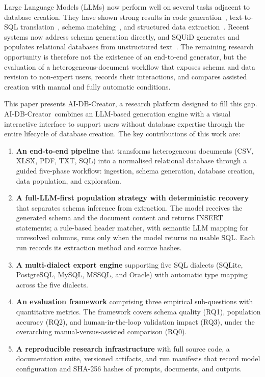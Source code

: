 \documentclass[11pt,a4paper]{article}
\newcommand{\aidb}{AI-DB-Creator}
\begin{document}
Large Language Models (LLMs) now perform well on several tasks adjacent to database creation. They have shown strong results in code generation~\citep{chen2021evaluating}, text-to-SQL translation~\citep{yu2018spider}, schema matching~\citep{parciak2024schema}, and structured data extraction~\citep{narayan2022data}. Recent systems now address schema generation directly, and SQUiD generates and populates relational databases from unstructured text~\citep{wang2025schemaagent,sadia2025squid}. The remaining research opportunity is therefore not the existence of an end-to-end generator, but the evaluation of a heterogeneous-document workflow that exposes schema and data revision to non-expert users, records their interactions, and compares assisted creation with manual and fully automatic conditions.

This paper presents \aidb, a research platform designed to fill this gap. \aidb\ combines an LLM-based generation engine with a visual interactive interface to support users without database expertise through the entire lifecycle of database creation. The key contributions of this work are:

\begin{enumerate}
  \item \textbf{An end-to-end pipeline} that transforms heterogeneous documents (CSV, XLSX, PDF, TXT, SQL) into a normalised relational database through a guided five-phase workflow: ingestion, schema generation, database creation, data population, and exploration.
  \item \textbf{A full-LLM-first population strategy with deterministic recovery} that separates schema inference from extraction. The model receives the generated schema and the document content and returns INSERT statements; a rule-based header matcher, with semantic LLM mapping for unresolved columns, runs only when the model returns no usable SQL. Each run records its extraction method and source hashes.
  \item \textbf{A multi-dialect export engine} supporting five SQL dialects (SQLite, PostgreSQL, MySQL, MSSQL, and Oracle) with automatic type mapping across the five dialects.
  \item \textbf{An evaluation framework} comprising three empirical sub-questions with quantitative metrics. The framework covers schema quality (RQ1), population accuracy (RQ2), and human-in-the-loop validation impact (RQ3), under the overarching manual-versus-assisted comparison (RQ0).
  \item \textbf{A reproducible research infrastructure} with full source code, a documentation suite, versioned artifacts, and run manifests that record model configuration and SHA-256 hashes of prompts, documents, and outputs.
\end{enumerate}
\end{document}
